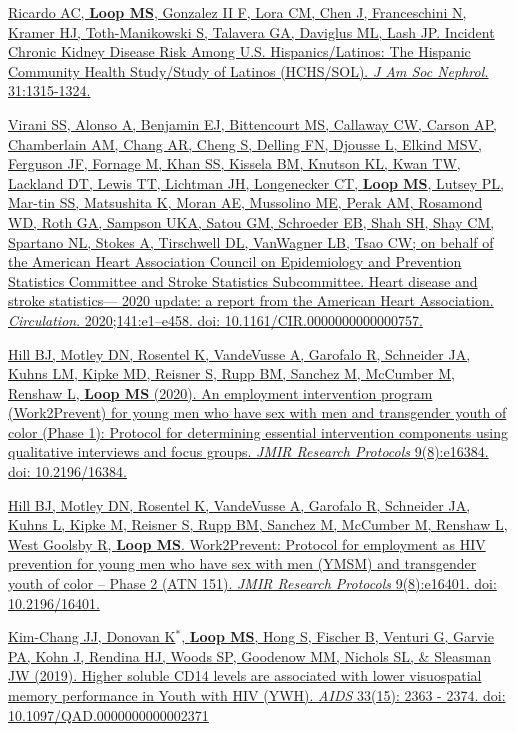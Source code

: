 \documentclass[10pt,letterpaper]{article}
\begin{document}
\begin{etaremune}
\item \href{https://jasn.asnjournals.org/content/jnephrol/31/6/1315.full.pdf}{Ricardo AC, \textbf{Loop MS}, Gonzalez II F, Lora CM, Chen J, Franceschini N, Kramer HJ, Toth-Manikowski S, Talavera GA, Daviglus ML, Lash JP. Incident Chronic Kidney Disease Risk Among U.S. Hispanics/Latinos: The Hispanic Community Health Study/Study of Latinos (HCHS/SOL). \emph{J Am Soc Nephrol.} 31:1315-1324.}

\item \href{https://www.ahajournals.org/doi/abs/10.1161/CIR.0000000000000757}{Virani SS, Alonso A, Benjamin EJ, Bittencourt MS, Callaway CW, Carson AP, Chamberlain AM, Chang AR, Cheng S, Delling FN, Djousse L, Elkind MSV, Ferguson JF, Fornage M, Khan SS, Kissela BM, Knutson KL, Kwan TW, Lackland DT, Lewis TT, Lichtman JH, Longenecker CT, \textbf{Loop MS}, Lutsey PL, Mar-tin SS, Matsushita K, Moran AE, Mussolino ME, Perak AM, Rosamond WD, Roth GA, Sampson UKA, Satou GM, Schroeder EB, Shah SH, Shay CM, Spartano NL, Stokes A, Tirschwell DL, VanWagner LB, Tsao CW; on behalf of the American Heart Association Council on Epidemiology and Prevention Statistics Committee and Stroke Statistics Subcommittee. Heart disease and stroke statistics— 2020 update: a report from the American Heart Association. \emph{Circulation}. 2020;141:e1–e458. doi: 10.1161/CIR.0000000000000757.}

\item \href{https://www.researchprotocols.org/2020/8/e16384/}{Hill BJ, Motley DN, Rosentel K, VandeVusse A, Garofalo R, Schneider JA, Kuhns LM, Kipke MD, Reisner S, Rupp BM, Sanchez M, McCumber M, Renshaw L, \textbf{Loop MS} (2020). An employment intervention program (Work2Prevent) for young men who have sex with men and transgender youth of color (Phase 1): Protocol for determining essential intervention components using qualitative interviews and focus groups. \emph{JMIR Research Protocols} 9(8):e16384. doi: 10.2196/16384.}

\item \href{https://www.researchprotocols.org/2020/8/e16401/}{Hill BJ, Motley DN, Rosentel K, VandeVusse A, Garofalo R, Schneider JA, Kuhns L, Kipke M, Reisner S, Rupp BM, Sanchez M, McCumber M, Renshaw L, West Goolsby R, \textbf{Loop MS}. Work2Prevent: Protocol for employment as HIV prevention for young men who have sex with men (YMSM) and transgender youth of color – Phase 2 (ATN 151). \emph{JMIR Research Protocols} 9(8):e16401. doi: 10.2196/16401.}


\item \href{https://journals.lww.com/aidsonline/Fulltext/2019/12010/Higher_soluble_CD14_levels_are_associated_with.9.aspx}{Kim-Chang JJ, Donovan K$^*$, \textbf{Loop MS}, Hong S, Fischer B, Venturi G, Garvie PA, Kohn J, Rendina HJ, Woods SP, Goodenow MM, Nichols SL, \& Sleasman JW (2019). Higher soluble CD14 levels are associated with lower visuospatial memory performance in Youth with HIV (YWH). \emph{AIDS} 33(15): 2363 - 2374. doi: 10.1097/QAD.0000000000002371}




\end{etaremune}
\end{document}
